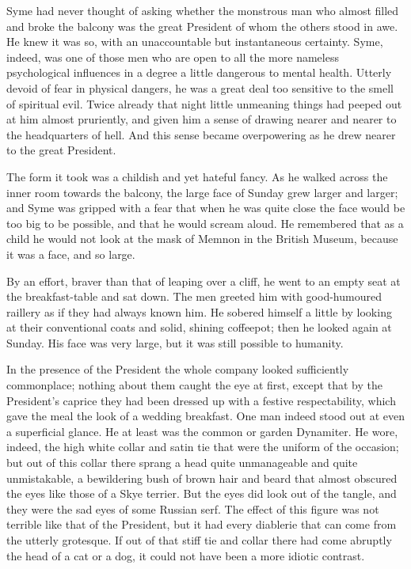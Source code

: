 Syme had never thought of asking whether the monstrous man who almost filled and broke the balcony was the great President of whom the others stood in awe. He knew it was so, with an unaccountable but instantaneous certainty. Syme, indeed, was one of those men who are open to all the more nameless psychological influences in a degree a little dangerous to mental health. Utterly devoid of fear in physical dangers, he was a great deal too sensitive to the smell of spiritual evil. Twice already that night little unmeaning things had peeped out at him almost pruriently, and given him a sense of drawing nearer and nearer to the headquarters of hell. And this sense became overpowering as he drew nearer to the great President.

The form it took was a childish and yet hateful fancy. As he walked across the inner room towards the balcony, the large face of Sunday grew larger and larger; and Syme was gripped with a fear that when he was quite close the face would be too big to be possible, and that he would scream aloud. He remembered that as a child he would not look at the mask of Memnon in the British Museum, because it was a face, and so large.

By an effort, braver than that of leaping over a cliff, he went to an empty seat at the breakfast-table and sat down. The men greeted him with good-humoured raillery as if they had always known him. He sobered himself a little by looking at their conventional coats and solid, shining coffeepot; then he looked again at Sunday. His face was very large, but it was still possible to humanity.

In the presence of the President the whole company looked sufficiently commonplace; nothing about them caught the eye at first, except that by the President’s caprice they had been dressed up with a festive respectability, which gave the meal the look of a wedding breakfast. One man indeed stood out at even a superficial glance. He at least was the common or garden Dynamiter. He wore, indeed, the high white collar and satin tie that were the uniform of the occasion; but out of this collar there sprang a head quite unmanageable and quite unmistakable, a bewildering bush of brown hair and beard that almost obscured the eyes like those of a Skye terrier. But the eyes did look out of the tangle, and they were the sad eyes of some Russian serf. The effect of this figure was not terrible like that of the President, but it had every diablerie that can come from the utterly grotesque. If out of that stiff tie and collar there had come abruptly the head of a cat or a dog, it could not have been a more idiotic contrast.

